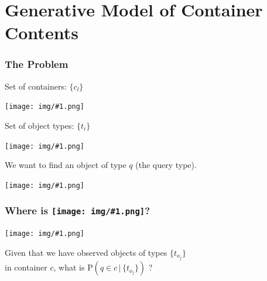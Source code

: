 \documentclass{beamer}
\def \spL [#1]{\texttt{[image: img/\#1.png]}}
\def \spM [#1]{\texttt{[image: img/\#1.png]}}
\begin{document}
\section{Generative Model of Container Contents}
\begin{frame}
  \frametitle{The Problem}
  \begin{center}
    \vspace{-0.13in}
    Set of containers: $\{c_l\}$

    \spL[3-unknown-containers]

    Set of object types: $\{t_i\}$

    \spL[shape-universe-small]

    We want to find an object of type $q$ (the query type).

    \spL[blue-circle]

  \end{center}
\end{frame}

\begin{frame}
  \frametitle{Where is \spM[blue-circle]?}
  \begin{center}
    \spL[3-partially-observed-containers]

    \vspace{0.3in}

    Given that we have observed objects of types $\{t_{o_j}\}$ \\
    in container $c$, what is $\mathrm{P}(q \in c \, | \, \{t_{o_j}\})$ ?
  \end{center}
\end{frame}
\end{document}
